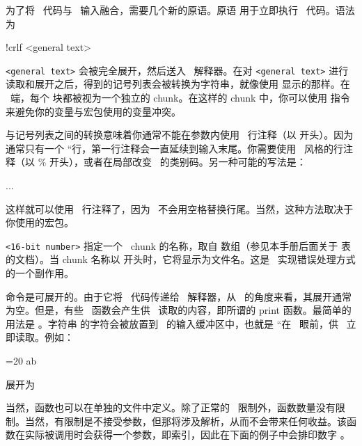 为了将 \LUA\ 代码与 \TEX\ 输入融合，需要几个新的原语。原语  用于立即执行 \LUA\ 代码。语法为

\begin{typing}
!crlf
 <general text>
\end{typing}

\texttt{<general text>} 会被完全展开，然后送入 \LUA\ 解释器。在对 \texttt{<general text>} 进行读取和展开之后，得到的记号列表会被转换为字符串，就像使用 \type {\the\toks} 显示的那样。在 \LUA\ 端，每个  块都被视为一个独立的 chunk。在这样的 chunk 中，你可以使用  指令来避免你的变量与宏包使用的变量冲突。

与记号列表之间的转换意味着你通常不能在参数内使用 \LUA\ 行注释（以 \type {--} 开头）。因为通常只有一个 ``行，第一行注释会一直延续到输入末尾。你需要使用 \TEX\ 风格的行注释（以 \% 开头），或者在局部改变 \TEX\ 的类别码。另一种可能的写法是：

\begin{typing}
\begingroup

\directlua ...
\endgroup
\end{typing}

这样就可以使用 \LUA\ 行注释了，因为 \TEX\ 不会用空格替换行尾。当然，这种方法取决于你使用的宏包。

\texttt{<16-bit number>} 指定一个 \LUA\ chunk 的名称，取自  数组（参见本手册后面关于  表的文档）。当 chunk 名称以  开头时，它将显示为文件名。这是 \LUA\ 实现错误处理方式的一个副作用。

 命令是可展开的。由于它将 \LUA\ 代码传递给 \LUA\ 解释器，从 \TEX\ 的角度来看，其展开通常为空。但是，有些 \LUA\ 函数会产生供 \TEX\ 读取的内容，即所谓的 print 函数。最简单的用法是 。字符串  的字符会被放置到 \TEX\ 的输入缓冲区中，也就是 ``在 \TEX\ 眼前，供 \TEX\ 立即读取。例如：

\begin{typing}
=20
ab
\end{typing}

展开为

\begin{typing}
 = function() tex.print("!") end
    t[2] = function() tex.print("?") end
}

\luafunction1
\luafunction2
\end{typing}

当然，函数也可以在单独的文件中定义。除了正常的 \LUA\ 限制外，函数数量没有限制。当然，有限制是不接受参数，但那将涉及解析，从而不会带来任何收益。该函数在实际被调用时会获得一个参数，即索引，因此在下面的例子中会排印数字 。

